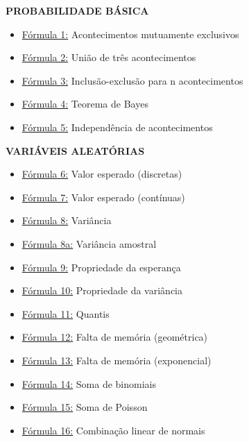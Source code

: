 \documentclass[a4paper,12pt]{article}
\begin{document}
\begin{multicols}{2}
\small
\textbf{\color{sectioncolor}PROBABILIDADE BÁSICA}
\begin{itemize}[leftmargin=*]
    \item \hyperref[formula1]{\color{formulalink}Fórmula 1:} Acontecimentos mutuamente exclusivos
    \item \hyperref[formula2]{\color{formulalink}Fórmula 2:} União de três acontecimentos
    \item \hyperref[formula3]{\color{formulalink}Fórmula 3:} Inclusão-exclusão para n acontecimentos
    \item \hyperref[formula4]{\color{formulalink}Fórmula 4:} Teorema de Bayes
    \item \hyperref[formula5]{\color{formulalink}Fórmula 5:} Independência de acontecimentos
\end{itemize}

\textbf{\color{sectioncolor}VARIÁVEIS ALEATÓRIAS}
\begin{itemize}[leftmargin=*]
    \item \hyperref[formula6]{\color{formulalink}Fórmula 6:} Valor esperado (discretas)
    \item \hyperref[formula7]{\color{formulalink}Fórmula 7:} Valor esperado (contínuas)
    \item \hyperref[formula8]{\color{formulalink}Fórmula 8:} Variância
    \item \hyperref[formula8a]{\color{formulalink}Fórmula 8a:} Variância amostral
    \item \hyperref[formula9]{\color{formulalink}Fórmula 9:} Propriedade da esperança
    \item \hyperref[formula10]{\color{formulalink}Fórmula 10:} Propriedade da variância
    \item \hyperref[formula11]{\color{formulalink}Fórmula 11:} Quantis
    \item \hyperref[formula12]{\color{formulalink}Fórmula 12:} Falta de memória (geométrica)
    \item \hyperref[formula13]{\color{formulalink}Fórmula 13:} Falta de memória (exponencial)
    \item \hyperref[formula14]{\color{formulalink}Fórmula 14:} Soma de binomiais
    \item \hyperref[formula15]{\color{formulalink}Fórmula 15:} Soma de Poisson
    \item \hyperref[formula16]{\color{formulalink}Fórmula 16:} Combinação linear de normais
\end{itemize}


\end{multicols}
\end{document}
